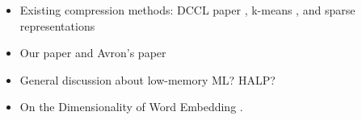 \begin{itemize}
	\item Existing compression methods: DCCL paper \citep{dccl17}, k-means \citep{andrews16}, and sparse representations \citep{sparse16}
	\item Our paper \citep{lprff18} and Avron's paper \citep{avron17}
	\item General discussion about low-memory ML? HALP?
	\item On the Dimensionality of Word Embedding \citep{yin18}.
\end{itemize}